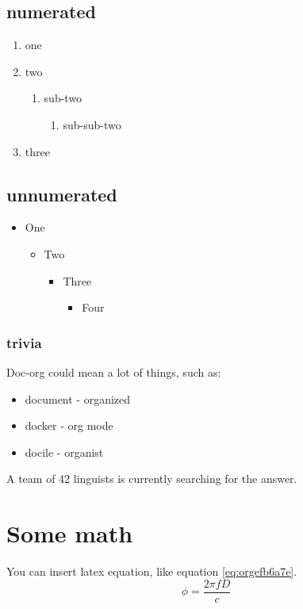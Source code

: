 \subsection{numerated}
\label{sec:org4f635e6}
\begin{enumerate}
\item one
\item two
\begin{enumerate}
\item sub-two
\begin{enumerate}
\item sub-sub-two
\end{enumerate}
\end{enumerate}
\item three
\end{enumerate}

\subsection{unnumerated}
\label{sec:org221665c}
\begin{itemize}
\item One
\begin{itemize}
\item Two
\begin{itemize}
\item Three
\begin{itemize}
\item Four
\end{itemize}
\end{itemize}
\end{itemize}
\end{itemize}

\subsubsection{trivia}
\label{sec:org4577100}
Doc-org could mean a lot of things, such as:
\begin{itemize}
\item document - organized
\item docker - org mode
\item docile - organist
\end{itemize}
A team of 42 linguists is currently searching for the answer.

\section{Some math}
\label{sec:org618071c}
You can insert latex equation, like equation \ref{eq:orgefb6a7e}.
\begin{equation}
\label{eq:orgefb6a7e}
\phi = \frac{2\pi fD}{c}
\end{equation}

